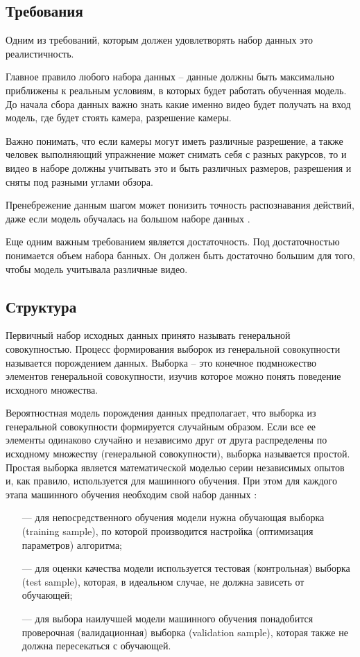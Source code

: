 \subsection{Требования}
Одним из требований, которым должен удовлетворять набор данных это реалистичность.

Главное правило любого набора данных -- данные должны быть максимально приближены к реальным условиям, в которых будет работать обученная модель. До начала сбора данных важно знать какие именно видео будет получать на вход модель, где будет стоять камера, разрешение камеры.

Важно понимать, что если камеры могут иметь различные разрешение, а также человек выполняющий упражнение может снимать себя с разных ракурсов, то и видео в наборе должны учитывать это и быть различных размеров, разрешения и сняты под разными углами обзора.

Пренебрежение данным шагом может понизить точность распознавания действий, даже если модель обучалась на большом наборе данных \cite{dataset1}. 

Еще одним важным требованием является достаточность.
Под достаточностью понимается объем набора банных. Он должен быть достаточно большим для того, чтобы модель учитывала различные видео.

\subsection{Структура}
Первичный набор исходных данных принято называть генеральной совокупностью. Процесс формирования выборок из генеральной совокупности называется порождением данных. Выборка -- это конечное подмножество элементов генеральной совокупности, изучив которое можно понять поведение исходного множества.

Вероятностная модель порождения данных предполагает, что выборка из генеральной совокупности формируется случайным образом. Если все ее элементы одинаково случайно и независимо друг от друга распределены по исходному множеству (генеральной совокупности), выборка называется простой. Простая выборка является математической моделью серии независимых опытов и, как правило, используется для машинного обучения. При этом для каждого этапа машинного обучения необходим свой набор данных \cite{dataset2}:
\begin{itemize}
	\item[---] для непосредственного обучения модели нужна обучающая выборка (training sample), по которой производится настройка (оптимизация параметров) алгоритма;
	\item[---] для оценки качества модели используется тестовая (контрольная) выборка (test sample), которая, в идеальном случае, не должна зависеть от обучающей;

	\item[---] для выбора наилучшей модели машинного обучения понадобится проверочная (валидационная) выборка (validation sample), которая также не должна пересекаться с обучающей.
\end{itemize}


